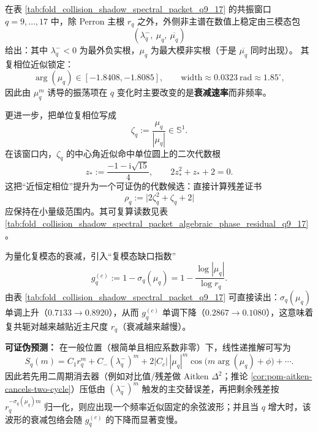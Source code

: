 \begin{remark}\label{rem:pom-resonance-trimodal-phase-lock}
在表 \ref{tab:fold_collision_shadow_spectral_packet_q9_17} 的共振窗口 \(q=9,\dots,17\) 中，除 Perron 主根 \(r_q\) 之外，外侧非主谱在数值上稳定由三模态包
\[
(\lambda_q^-,\ \mu_q,\ \overline{\mu_q})
\]
给出：其中 \(\lambda_q^-<0\) 为最外负实根，\(\mu_q\) 为最大模非实根（于是 \(\overline{\mu_q}\) 同时出现）。
其复相位近似锁定：
\[
\arg(\mu_q)\in[-1.8408,-1.8085],
\qquad
\mathrm{width}\approx 0.0323\ \mathrm{rad}\approx 1.85^\circ,
\]
因此由 \(\mu_q^m\) 诱导的振荡项在 \(q\) 变化时主要改变的是\textbf{衰减速率}而非频率。
\par
更进一步，把单位复相位写成
\[
\zeta_q:=\frac{\mu_q}{|\mu_q|}\in\mathbb{S}^1.
\]
在该窗口内，\(\zeta_q\) 的中心角近似命中单位圆上的二次代数根
\[
z_\ast:=\frac{-1-\mathrm{i}\sqrt{15}}{4},
\qquad
2z_\ast^2+z_\ast+2=0.
\]
这把“近恒定相位”提升为一个可证伪的代数候选：直接计算残差证书
\[
\rho_q:=\bigl|2\zeta_q^2+\zeta_q+2\bigr|
\]
应保持在小量级范围内。其可复算读数见表 \ref{tab:fold_collision_shadow_spectral_packet_algebraic_phase_residual_q9_17}。
\par
为量化复模态的衰减，引入“复模态缺口指数”
\[
g_q^{(c)}:=1-\sigma_q(\mu_q)
=1-\frac{\log|\mu_q|}{\log r_q}.
\]
由表 \ref{tab:fold_collision_shadow_spectral_packet_q9_17} 可直接读出：\(\sigma_q(\mu_q)\) 单调上升（\(0.7133\to 0.8920\)），从而
\(
g_q^{(c)}
\)
单调下降（\(0.2867\to 0.1080\)），这意味着复共轭对越来越贴近主尺度 \(r_q\)（衰减越来越慢）。
\par
\textbf{可证伪预测：}
在一般位置（根简单且相应系数非零）下，线性递推解可写为
\[
S_q(m)=C_1 r_q^m + C_- (\lambda_q^-)^m + 2|C_c|\,|\mu_q|^m\cos\!\bigl(m\arg(\mu_q)+\phi\bigr)+\cdots.
\]
因此若先用二周期消去器（例如对比值/残差做 Aitken \(\Delta^2\)；推论 \ref{cor:pom-aitken-cancels-two-cycle}）压低由 \((\lambda_q^-)^m\) 触发的主交替误差，再把剩余残差按 \(r_q^{-\sigma_q(\mu_q)m}\) 归一化，则应出现一个频率近似固定的余弦波形；并且当 \(q\) 增大时，该波形的衰减包络会随 \(g_q^{(c)}\) 的下降而显著变慢。
\end{remark}



